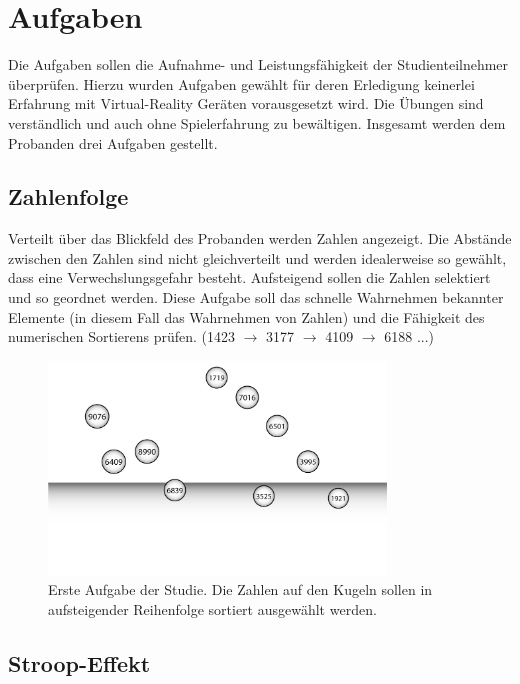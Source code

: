 \section{Aufgaben}\label{sec:tasks}

Die Aufgaben sollen die Aufnahme- und Leistungsfähigkeit der Studienteilnehmer überprüfen. Hierzu wurden Aufgaben gewählt für deren Erledigung keinerlei Erfahrung mit Virtual-Reality Geräten vorausgesetzt wird. Die Übungen sind verständlich und auch ohne Spielerfahrung zu bewältigen.
Insgesamt werden dem Probanden drei Aufgaben gestellt. 

\subsection{Zahlenfolge} 

Verteilt über das Blickfeld des Probanden werden Zahlen angezeigt. Die Abstände zwischen den Zahlen sind nicht gleichverteilt und werden idealerweise so gewählt, dass eine Verwechslungsgefahr besteht. Aufsteigend sollen die Zahlen selektiert und so geordnet werden. Diese Aufgabe soll das schnelle Wahrnehmen bekannter Elemente (in diesem Fall das Wahrnehmen von Zahlen) und die Fähigkeit des numerischen Sortierens prüfen. 
(1423 $\rightarrow$ 3177 $\rightarrow$ 4109 $\rightarrow$ 6188 ...)

\begin{figure}[H]
	\centering
	\includegraphics[width=0.8\textwidth]{./images/ordering_abstract.png}
	\caption{Erste Aufgabe der Studie. Die Zahlen auf den Kugeln sollen in aufsteigender Reihenfolge sortiert ausgewählt werden.}
	\label{fig:ordeing_abstract}
\end{figure}

\subsection{Stroop-Effekt} 

